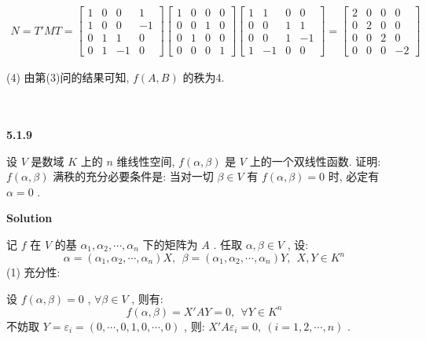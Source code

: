 \documentclass[11pt,a4paper,openany,oneside]{book}
\newcommand\Solution{\noindent\textbf{\textsf{Solution}}\par\medskip}
\begin{document}
\begin{gather*}
N = T'MT=
\begin{bmatrix}
1  &  0  &  0  &  1  \\
1  &  0  &  0  &  -1  \\
0  &  1  &  1  &  0  \\
0  &  1  &  -1 &  0
\end{bmatrix}
\begin{bmatrix}
1  &  0  &  0  &  0  \\
0  &  0  &  1  &  0  \\
0  &  1  &  0  &  0  \\
0  &  0  &  0  &  1
\end{bmatrix}
\begin{bmatrix}
1  &  1  &  0  &  0 \\
0  &  0  &  1  &  1  \\
0  &  0  &  1  & -1  \\
1  & -1  &  0  &  0
\end{bmatrix}=
\begin{bmatrix}
2  &  0  &  0  &  0  \\
0  &  2  &  0  &  0  \\
0  &  0  &  2  &  0 \\
0  &  0  &  0  &  -2
\end{bmatrix}
\end{gather*}

(4) 由第(3)问的结果可知,  $ f(A,B) $ 的秩为4. \\  \\  \\




\begin{myexample}
	\textbf{5.1.9}

设 $ V $ 是数域 $ K $ 上的 $ n $ 维线性空间,  $ f(\alpha, \beta) $ 是 $ V $ 上的一个双线性函数. 证明:  $ f(\alpha, \beta) $ 满秩的充分必要条件是: 当对一切 $ \beta \in V $ 有 $ f(\alpha, \beta) = 0 $ 时, 必定有 $ \alpha = 0 $ .   \\

\end{myexample}
\Solution 

记 $ f $ 在 $ V $ 的基 $ \alpha_1, \alpha_2, \cdots, \alpha_n $ 下的矩阵为 $ A $ . 任取 $ \alpha, \beta \in V $ , 设:
 $$  \alpha = (\alpha_1, \alpha_2, \cdots, \alpha_n)X, \ \ \beta = (\alpha_1, \alpha_2, \cdots, \alpha_n)Y, \ \ X, Y \in K^n  $$ 
(1) 充分性:

设 $ f(\alpha, \beta)=0 $ ,  $ \forall \beta \in V $ , 则有:
 $$  f(\alpha, \beta) = X'AY =0, \ \ \forall Y \in K^n  $$ 
不妨取 $ Y=\varepsilon_i = (0,\cdots,0,1,0,\cdots, 0) $ , 则: $ X'A\varepsilon_i = 0,\ (i=1, 2, \cdots, n) $ . 
\end{document}
